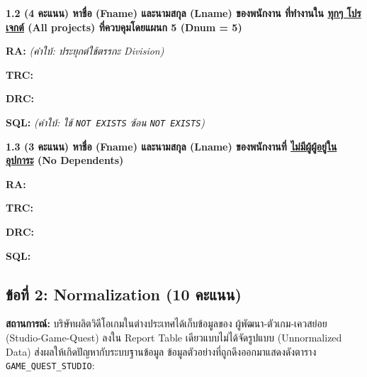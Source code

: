\documentclass[a4paper,12pt]{article}
\begin{document}
\newpage

\textbf{1.2 (4 คะแนน) หาชื่อ (Fname) และนามสกุล (Lname) ของพนักงาน ที่ทำงานใน \underline{ทุกๆ โปรเจกต์} (All projects) ที่ควบคุมโดยแผนก 5 (Dnum = 5)}

\vspace{0.1cm}
\textbf{RA:} \textit{(คำใบ้: ประยุกต์ใช้ตรรกะ Division)}
\vspace{3.5cm}

\textbf{TRC:}
\vspace{3.5cm}

\textbf{DRC:}
\vspace{3.5cm}

\textbf{SQL:} \textit{(คำใบ้: ใช้ \texttt{NOT EXISTS} ซ้อน \texttt{NOT EXISTS})}
\vspace{4.5cm}

\newpage

\textbf{1.3 (3 คะแนน) หาชื่อ (Fname) และนามสกุล (Lname) ของพนักงานที่ \underline{ไม่มีผู้ผู้อยู่ในอุปการะ} (No Dependents)}

\vspace{0.1cm}
\textbf{RA:}
\vspace{3.5cm}

\textbf{TRC:}
\vspace{3.5cm}

\textbf{DRC:}
\vspace{3.5cm}

\textbf{SQL:}
\vspace{4.5cm}

\newpage
\subsection*{ข้อที่ 2: Normalization (10 คะแนน)}
\textbf{สถานการณ์:} 
บริษัทผลิตวิดีโอเกมในต่างประเทศได้เก็บข้อมูลของ ผู้พัฒนา-ตัวเกม-เควสย่อย (Studio-Game-Quest) ลงใน Report Table เดียวแบบไม่ได้จัดรูปแบบ (Unnormalized Data) ส่งผลให้เกิดปัญหากับระบบฐานข้อมูล ข้อมูลตัวอย่างที่ถูกดึงออกมาแสดงดังตาราง \texttt{GAME\_QUEST\_STUDIO}:
\end{document}
